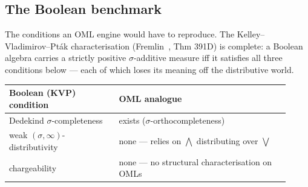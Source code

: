 \documentclass[11pt,reqno]{amsart}
\theoremstyle{plain}
\theoremstyle{definition}
\theoremstyle{remark}
\begin{document}
\subsection{The Boolean benchmark}
The conditions an OML engine would have to reproduce. The
Kelley--Vladimirov--Pt\'{a}k characterisation (Fremlin~\cite{Fremlin3},
Thm 391D) is complete: a Boolean algebra carries a strictly positive
$\sigma$-additive measure iff it satisfies all three conditions below ---
each of which loses its meaning off the distributive world.
\begin{center}
\begin{tabular}{@{}>{\raggedright\arraybackslash}p{0.36\linewidth}>{\raggedright\arraybackslash}p{0.56\linewidth}@{}}
\toprule
\textbf{Boolean (KVP) condition} & \textbf{OML analogue} \\
\midrule
Dedekind $\sigma$-completeness & exists ($\sigma$-orthocompleteness) \\[2pt]
weak $(\sigma,\infty)$-distributivity
  & none --- relies on $\bigwedge$ distributing over $\bigvee$ \\[2pt]
chargeability
  & none --- no structural characterisation on OMLs \\
\bottomrule
\end{tabular}
\end{center}
\end{document}
